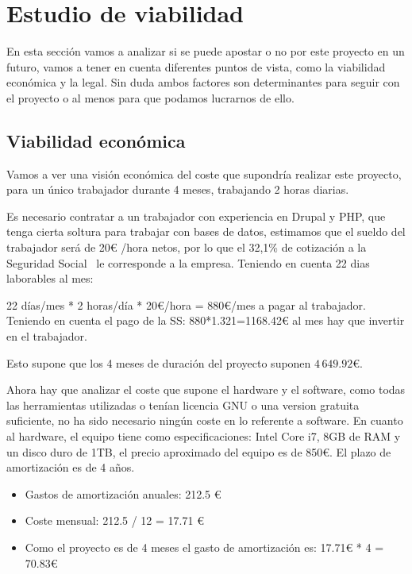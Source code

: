\section{Estudio de viabilidad}
En esta sección vamos a analizar si se puede apostar o no por este proyecto en un futuro, vamos a tener en cuenta diferentes puntos de vista, como la viabilidad económica y la legal. Sin duda ambos factores son determinantes para seguir con el proyecto o al menos para que podamos lucrarnos de ello.


\subsection{Viabilidad económica}
Vamos a ver una visión económica del coste que supondría realizar este proyecto, para un único trabajador durante 4 meses, trabajando 2 horas diarias.

Es necesario contratar a un trabajador con experiencia en Drupal y PHP, que tenga cierta soltura para trabajar con bases de datos, estimamos que el sueldo del trabajador será de 20\euro{} /hora netos, por lo que el 32,1\% de cotización a la Seguridad Social~\cite{cotizacion_ss} le corresponde a la empresa.
Teniendo en cuenta 22 dias laborables al mes:

22 días/mes * 2 horas/día * 20\euro/hora = 880\euro/mes a pagar al trabajador.
Teniendo en cuenta el pago de la SS:
880*1.321=1168.42\euro{} al mes hay que invertir en el trabajador.

Esto supone que los 4 meses de duración del proyecto suponen $4\,649.92$\euro{}.

Ahora hay que analizar el coste que supone el hardware y el software, como todas las herramientas utilizadas o tenían licencia GNU o una version gratuita suficiente, no ha sido necesario ningún coste en lo referente a software.
En cuanto al hardware, el equipo tiene como especificaciones: Intel Core i7, 8GB de RAM y un disco duro de 1TB, el precio aproximado del equipo es de 850\euro{}. El plazo de amortización es de 4 años.

\begin{itemize}
\item Gastos de amortización anuales: 212.5 \euro{}
\item Coste mensual: 212.5 / 12 = 17.71 \euro{}
\item Como el proyecto es de 4 meses el gasto de amortización es: 17.71\euro{} * 4 = 70.83\euro{}
\end{itemize}

